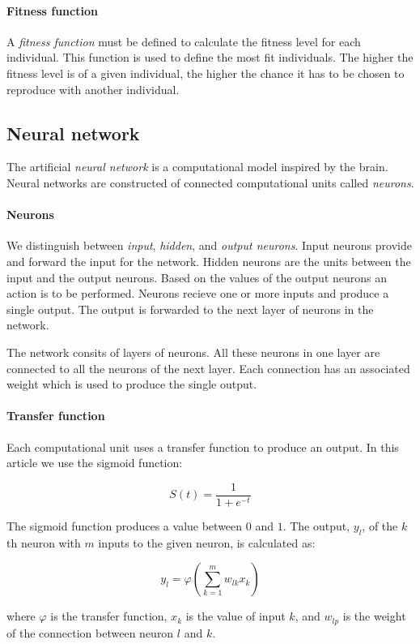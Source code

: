 \paragraph{Fitness function}

A \emph{fitness function} must be defined to calculate the fitness level for each individual.
This function is used to define the most fit individuals.
The higher the fitness level is of a given individual, the higher the chance it has to be chosen to reproduce with another individual.

\subsection{Neural network}

The artificial \emph{neural network} is a computational model inspired by the brain.
Neural networks are constructed of connected computational units called \emph{neurons}.

\paragraph{Neurons}

We distinguish between \emph{input}, \emph{hidden}, and \emph{output neurons}. 
Input neurons provide and forward the input for the network.
Hidden neurons are the units between the input and the output neurons. 
Based on the values of the output neurons an action is to be performed.
Neurons recieve one or more inputs and produce a single output.
The output is forwarded to the next layer of neurons in the network.

The network consits of layers of neurons.
All these neurons in one layer are connected to all the neurons of the next layer.
Each connection has an associated weight which is used to produce the single output.

\paragraph{Transfer function}

Each computational unit uses a transfer function to produce an output.
In this article we use the sigmoid function:

\[
    S(t) = \frac{1}{1+e^{-t}}
\]

The sigmoid function produces a value between $0$ and $1$.
The output, $y_l$, of the $k$th neuron with $m$ inputs to the given neuron, is calculated as:

\[
    y_l = \varphi\left( \sum_{k=1}^m w_{lk} x_k \right)
\]

where $\varphi$ is the transfer function, $x_k$ is the value of input $k$, and $w_{l p}$ is the weight of the connection between neuron $l$ and $k$.





